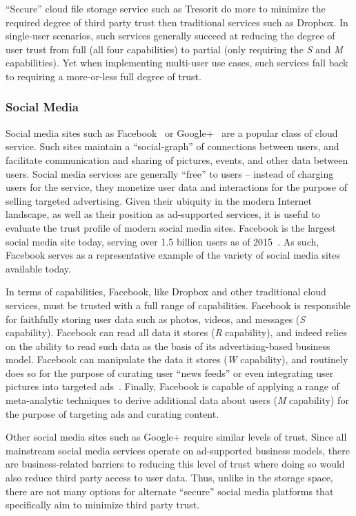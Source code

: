 ``Secure'' cloud file storage service such as Tresorit do more to
minimize the required degree of third party trust then traditional
services such as Dropbox. In single-user scenarios, such services
generally succeed at reducing the degree of user trust from full (all
four capabilities) to partial (only requiring the \emph{S} and
\emph{M} capabilities). Yet when implementing multi-user use cases,
such services fall back to requiring a more-or-less full degree of
trust.

\subsubsection{Social Media}

Social media sites such as Facebook~\cite{facebook} or
Google+~\cite{google-plus} are a popular class of cloud service. Such
sites maintain a ``social-graph'' of connections between users, and
facilitate communication and sharing of pictures, events, and other
data between users. Social media services are generally ``free'' to
users -- instead of charging users for the service, they monetize user
data and interactions for the purpose of selling targeted
advertising. Given their ubiquity in the modern Internet landscape, as
well as their position as ad-supported services, it is useful to
evaluate the trust profile of modern social media sites. Facebook is
the largest social media site today, serving over 1.5 billion users as
of 2015~\cite{foster2014}. As such, Facebook serves as a
representative example of the variety of social media sites available
today.

In terms of capabilities, Facebook, like Dropbox and other traditional
cloud services, must be trusted with a full range of capabilities.
Facebook is responsible for faithfully storing user data such as
photos, videos, and messages (\emph{S} capability). Facebook can read
all data it stores (\emph{R} capability), and indeed relies on the
ability to read such data as the basis of its advertising-based
business model. Facebook can manipulate the data it stores (\emph{W}
capability), and routinely does so for the purpose of curating user
``news feeds'' or even integrating user pictures into targeted
ads~\cite{mashable-socialads}. Finally, Facebook is capable of
applying a range of meta-analytic techniques to derive additional data
about users (\emph{M} capability) for the purpose of targeting ads and
curating content.

Other social media sites such as Google+ require similar levels of
trust. Since all mainstream social media services operate on
ad-supported business models, there are business-related barriers to
reducing this level of trust where doing so would also reduce third
party access to user data. Thus, unlike in the storage space, there
are not many options for alternate ``secure'' social media platforms
that specifically aim to minimize third party trust.

